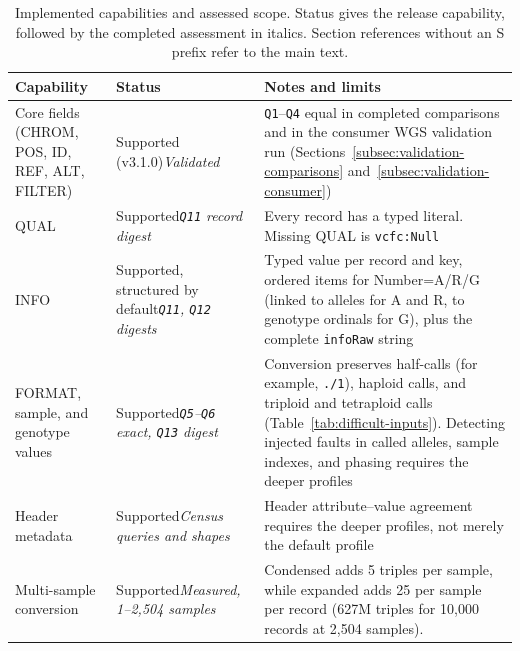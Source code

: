 \documentclass[11pt]{article}
\newcommand{\rowsep}{\noalign{\vskip2pt{\color{black!22}\hrule height 0.4pt}\vskip2pt}}%
\begin{document}
\begin{table}[!htbp]
\caption{Implemented capabilities and assessed scope.
Status gives the release capability, followed by the completed assessment in italics.
Section references without an S prefix refer to the main text.}\label{tab:capabilities}%
\centering\footnotesize\setlength{\tabcolsep}{4pt}\renewcommand{\arraystretch}{1.1}\renewcommand{\tabularxcolumn}[1]{m{#1}}%
\begin{tabularx}{\textwidth}{@{}>{\raggedright\arraybackslash}m{}>{\raggedright\arraybackslash}m{}>{\raggedright\arraybackslash}X@{}}
\toprule
\textbf{Capability} & \textbf{Status} & \textbf{Notes and limits}\\
\midrule
Core fields (CHROM, POS, ID, REF, ALT, FILTER) & Supported (v3.1.0)\newline\textit{Validated} & \texttt{Q1}--\texttt{Q4} equal in completed comparisons and in the consumer WGS validation run (Sections~\ref{subsec:validation-comparisons} and~\ref{subsec:validation-consumer})\\
\rowsep
QUAL & Supported\newline\textit{\texttt{Q11} record digest} & Every record has a typed literal.
Missing QUAL is \texttt{vcfc:Null}\\
\rowsep
INFO & Supported, structured by default\newline\textit{\texttt{Q11}, \texttt{Q12} digests} & Typed value per record and key, ordered items for Number=A/R/G (linked to alleles for A and R, to genotype ordinals for G), plus the complete \texttt{infoRaw} string\\
\rowsep
FORMAT, sample, and genotype values & Supported\newline\textit{\texttt{Q5}--\texttt{Q6} exact, \texttt{Q13} digest} & Conversion preserves half-calls (for example, \texttt{./1}), haploid calls, and triploid and tetraploid calls (Table~\ref{tab:difficult-inputs}).
Detecting injected faults in called alleles, sample indexes, and phasing requires the deeper profiles\\
\rowsep
Header metadata & Supported\newline\textit{Census queries and shapes} & Header attribute--value agreement requires the deeper profiles, not merely the default profile\\
\rowsep
Multi-sample conversion & Supported\newline\textit{Measured, 1--2{,}504 samples} & Condensed adds 5 triples per sample, while expanded adds 25 per sample per record (627M triples for 10{,}000 records at 2{,}504 samples).

\end{tabularx}
\end{table}
\end{document}
